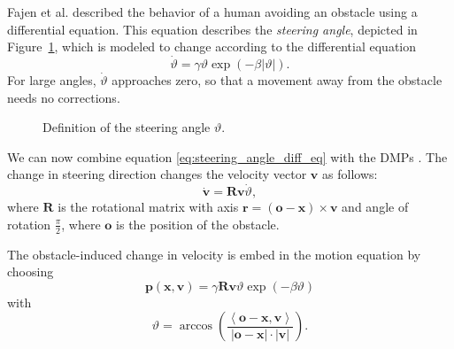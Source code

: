 \documentclass[fleqn, 11pt]{article}
\theoremstyle{definition}
\theoremstyle{plain}
\theoremstyle{remark}
\begin{document}
Fajen et al. \cite{FW03} described the behavior of a human avoiding an obstacle using a differential equation. This equation describes the \emph{steering angle}, depicted in Figure~\ref{fig:steering_angle}, which is modeled to change according to the differential equation
\begin{equation}\label{eq:steering_angle_diff_eq}
    \dot{\vartheta} = \gamma \vartheta \exp (-\beta |\vartheta|).
\end{equation}
For large angles, $\dot\vartheta $ approaches zero, so that a movement away from the obstacle needs no corrections.

\begin{figure}[tbp]
    \centering
    \caption{Definition of the steering angle $\vartheta$.}
    \label{fig:steering_angle}
\end{figure}

We can now combine equation \eqref{eq:steering_angle_diff_eq} with the DMPs \cite{HPPS09}. The change in steering direction changes the velocity vector $\mathbf{v}$ as follows:
\[ \dot{\mathbf{v}} = \mathbf{R} \mathbf{v} \dot\vartheta, \]
where $\mathbf{R}$ is the rotational matrix with axis $\mathbf{r} = (\mathbf{o} - \mathbf{x}) \times \mathbf{v}$ and angle of rotation $\tfrac{\pi}{2}$, where $\mathbf{o}$ is the position of the obstacle.

The obstacle-induced change in velocity is embed in the motion equation by choosing
\begin{equation}
    \mathbf{p}(\mathbf{x},\mathbf{v}) = \gamma \mathbf{R} \mathbf{v} \vartheta \exp (-\beta \vartheta)
    \label{eq:obst_avoid_steering_angle}
\end{equation}
with 
\[ \vartheta = \arccos \left( { \frac{ \left\langle  {\mathbf{o} - \mathbf{x}}, {\mathbf{v}}\right\rangle }{|\mathbf{o} - \mathbf{x}| \cdot |\mathbf{v}|} }  \right) . \]
\end{document}
